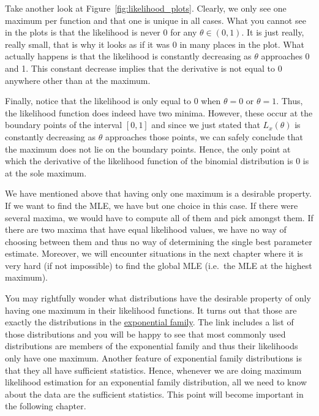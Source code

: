 Take another look at Figure~\ref{fig:likelihood_plots}. Clearly, we only
see one maximum per function and that one is unique in all cases. 
What you cannot see in the plots is that the likelihood is never 0 for any $ \theta \in (0,1) $. It is just
really, really small, that is why it looks as if it was 0 in many places in the plot. What actually happens is that the likelihood is constantly decreasing as
$ \theta $ approaches 0 and 1. This constant decrease implies that the derivative is not equal to $ 0 $ anywhere other than at the maximum.

Finally, notice that the likelihood is only equal to 0 when $ \theta = 0 $ or $ \theta = 1 $. 
Thus, the likelihood function does indeed have two minima. However, these 
occur at the boundary points of the interval $ [0,1] $ and since we just stated that $ L_{x}(\theta) $ is constantly decreasing as $ \theta $ approaches those points,
we can safely conclude that the maximum does not lie on the boundary points. Hence, the only point at which the
derivative of the likelihood function of the binomial distribution is $ 0 $ is at the sole maximum.

We have mentioned above that having only one maximum is a desirable property. If we want to find the MLE, we have but one choice in this case. If there were
several maxima, we would have to compute all of them and pick amongst them. If there are two maxima that have equal likelihood values, we have no way of choosing
between them and thus no way of determining the single best parameter estimate. Moreover, we will encounter situations in the next chapter where it is very hard (if not
impossible) to find the global MLE (i.e.\ the MLE at the highest maximum).

You may rightfully wonder what distributions have the desirable property of only having one maximum in their likelihood functions. It turns out that those are
exactly the distributions in the \href{https://en.wikipedia.org/wiki/Exponential_family}{exponential family}. The link includes a list of those distributions and
you will be happy to see that most commonly used distributions are members of the exponential family and thus their likelihoods only have one maximum. Another feature of exponential family distributions is that
they all have sufficient statistics. Hence, whenever we are doing maximum likelihood estimation for 
an exponential family distribution, all we need to know about the data are the sufficient statistics. This
point will become important in the following chapter.

